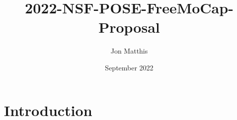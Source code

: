 \documentclass{article}
\title{2022-NSF-POSE-FreeMoCap-Proposal}
\author{Jon Matthis}
\date{September 2022}
\begin{document}
\maketitle

\section{Introduction}
\end{document}
